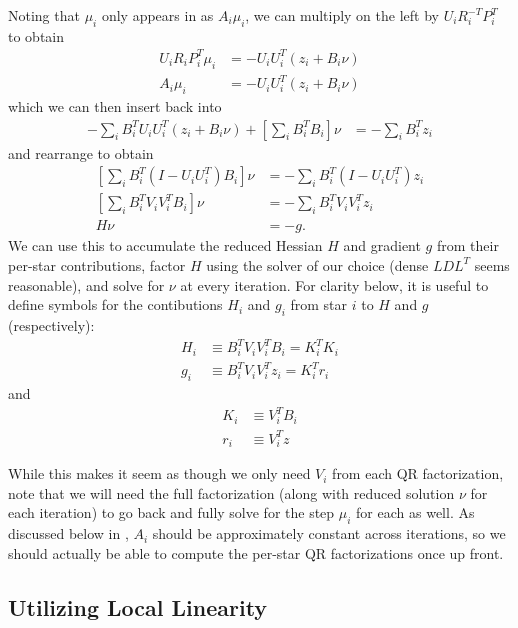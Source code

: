 Noting that $\mu_i$ only appears in  as $A_i\mu_i$, we can multiply  on the left by $U_i R_i^{-T} P_i^T$ to obtain
\begin{align}
    U_i R_i P_i^T \mu_i &= -U_i U_i^T \left(z_i + B_i\nu\right) \\
    A_i \mu_i &= -U_i U_i^T \left(z_i + B_i\nu\right) \label{eq:vp_star_subproblem_qr_2}
\end{align}
which we can then insert back into 
\begin{align}
    -\sum_i B_i^T U_i U_i^T \left(z_i + B_i\nu\right) + \left[\sum_i B_i^T B_i\right]\nu &= -\sum_i B_i^T z_i
\end{align}
and rearrange to obtain
\begin{align}
    \left[\sum_i B_i^T \left(I - U_i U_i^T\right) B_i\right]\nu &=
        -\sum_i B_i^T \left(I - U_i U_i^T\right) z_i \\
    \left[\sum_i B_i^T V_i V_i^T B_i\right]\nu &=
        -\sum_i B_i^T V_i V_i^T z_i \\
    H\nu &= -g.
\end{align}
We can use this to accumulate the reduced Hessian $H$ and gradient $g$ from their per-star contributions, factor $H$ using the solver of our choice (dense $LDL^T$ seems reasonable), and solve for $\nu$ at every iteration.
For clarity below, it is useful to define symbols for the contibutions $H_i$ and $g_i$ from star $i$ to $H$ and $g$ (respectively):
\begin{align}
    H_i &\equiv B_i^T V_i V_i^T B_i = K_i^T K_i \\
    g_i &\equiv B_i^T V_i V_i^T z_i = K_i^T r_i
\end{align}
and
\begin{align}
    K_i &\equiv V_i^T B_i \\
    r_i &\equiv V_i^T z
\end{align}

While this makes it seem as though we only need $V_i$ from each QR factorization, note that we will need the full factorization (along with reduced solution $\nu$ for each iteration) to go back and fully solve for the step $\mu_i$ for each  as well.
As discussed below in , $A_i$ should be approximately constant across iterations, so we should actually be able to compute the per-star QR factorizations once up front.

\subsection{Utilizing Local Linearity}
\label{sec:vp_local_linearity}

